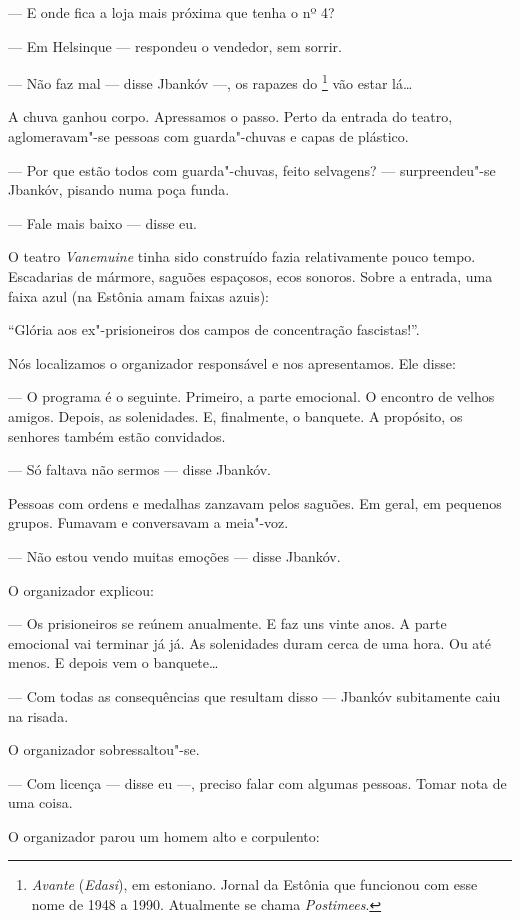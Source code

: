 --- E onde fica a loja mais próxima que tenha o nº 4?

--- Em Helsinque --- respondeu o vendedor, sem sorrir.

--- Não faz mal --- disse Jbankóv ---, os rapazes do
\emph{}\footnote{\emph{Avante} (\emph{Edasi}), em estoniano.
  Jornal da Estônia que funcionou com esse nome de 1948 a 1990.
  Atualmente se chama \emph{Postimees}.} vão estar lá\ldots{}

A chuva ganhou corpo. Apressamos o passo. Perto da entrada do teatro,
aglomeravam"-se pessoas com guarda"-chuvas e capas de plástico.

--- Por que estão todos com guarda"-chuvas, feito selvagens? ---
surpreendeu"-se Jbankóv, pisando numa poça funda.

--- Fale mais baixo --- disse eu.

O teatro \emph{Vanemuine} tinha sido construído fazia relativamente
pouco tempo. Escadarias de mármore, saguões espaçosos, ecos sonoros.
Sobre a entrada, uma faixa azul (na Estônia amam faixas azuis):

``Glória aos ex"-prisioneiros dos campos de concentração fascistas!''.

Nós localizamos o organizador responsável e nos apresentamos. Ele disse:

--- O programa é o seguinte. Primeiro, a parte emocional. O encontro de
velhos amigos. Depois, as solenidades. E, finalmente, o banquete. A
propósito, os senhores também estão convidados.

--- Só faltava não sermos --- disse Jbankóv.

Pessoas com ordens e medalhas zanzavam pelos saguões. Em geral, em
pequenos grupos. Fumavam e conversavam a meia"-voz.

--- Não estou vendo muitas emoções --- disse Jbankóv.

O organizador explicou:

--- Os prisioneiros se reúnem anualmente. E faz uns vinte anos. A parte
emocional vai terminar já já. As solenidades duram cerca de uma hora. Ou
até menos. E depois vem o banquete\ldots{}

--- Com todas as consequências que resultam disso --- Jbankóv
subitamente caiu na risada.

O organizador sobressaltou"-se.

--- Com licença --- disse eu ---, preciso falar com algumas pessoas.
Tomar nota de uma coisa.

O organizador parou um homem alto e corpulento:

